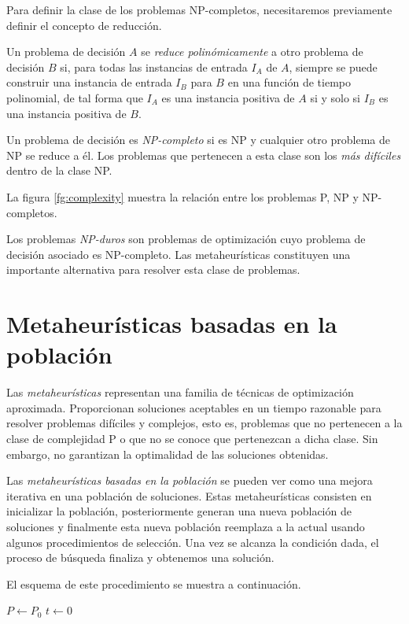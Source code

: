 Para definir la clase de los problemas NP-completos, necesitaremos previamente definir el concepto de reducción.

\begin{definition}
    Un problema de decisión $A$ se \emph{reduce polinómicamente} a otro problema de decisión $B$ si, para todas las instancias de entrada $I_A$ de $A$, siempre se puede construir una instancia de entrada $I_B$ para $B$ en una función de tiempo polinomial, de tal forma que $I_A$ es una instancia positiva de $A$ si y solo si $I_B$ es una instancia positiva de $B$.
\end{definition}

Un problema de decisión es \emph{NP-completo} si es NP y cualquier otro problema de NP se reduce a él. Los problemas que pertenecen a esta clase son los \emph{más difíciles} dentro de la clase NP.

La figura \ref{fg:complexity} muestra la relación entre los problemas P, NP y NP-completos.

Los problemas \emph{NP-duros} son problemas de optimización cuyo problema de decisión asociado es NP-completo. Las metaheurísticas constituyen una importante alternativa para resolver esta clase de problemas.

\section{Metaheurísticas basadas en la población}

Las \emph{metaheurísticas} representan una familia de técnicas de optimización aproximada. Proporcionan soluciones aceptables en un tiempo razonable para resolver problemas difíciles y complejos, esto es, problemas que no pertenecen a la clase de complejidad P o que no se conoce que pertenezcan a dicha clase. Sin embargo, no garantizan la optimalidad de las soluciones obtenidas.

Las \emph{metaheurísticas basadas en la población} se pueden ver como una mejora iterativa en una población de soluciones. Estas metaheurísticas consisten en inicializar la población, posteriormente generan una nueva población de soluciones y finalmente esta nueva población reemplaza a la actual usando algunos procedimientos de selección. Una vez se alcanza la condición dada, el proceso de búsqueda finaliza y obtenemos una solución.

El esquema de este procedimiento se muestra a continuación.

\begin{Ualgorithm}[H]
    \small
    \DontPrintSemicolon
    $P \longleftarrow P_0$ 
    $t \longleftarrow 0$\;
\end{Ualgorithm}

